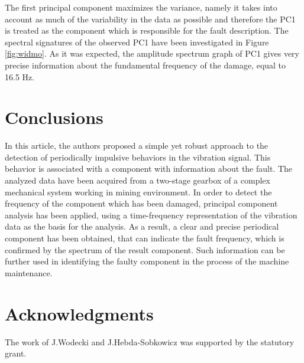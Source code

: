 \documentclass[10pt]{article}
\begin{document}
The first principal component maximizes the variance, namely it takes into account as much of the variability in the data as possible and therefore the PC1 is treated as the component which is responsible for the fault description. The spectral signatures of the observed PC1 have been investigated in Figure \ref{fig:widmo}. As it was expected, the amplitude spectrum graph of PC1 gives very precise information about the fundamental frequency of the damage, equal to 16.5 Hz.



\section{Conclusions}
In this article, the authors proposed a simple yet robust approach to the detection of periodically impulsive behaviors in the vibration signal. This behavior is associated with a component with information about the fault. The analyzed data have been acquired from a two-stage gearbox of a complex mechanical system working in mining environment. In order to detect the frequency of the component which has been damaged, principal component analysis has been applied, using a time-frequency representation of the vibration data as the basis for the analysis. As a result, a clear and precise periodical component has been obtained, that can indicate the fault frequency, which is confirmed by the spectrum of the result component. Such information can be further used in identifying the faulty component in the process of the machine maintenance.
\section*{Acknowledgments}
The work of J.Wodecki and J.Hebda-Sobkowicz was supported by the statutory grant.


\end{document}
